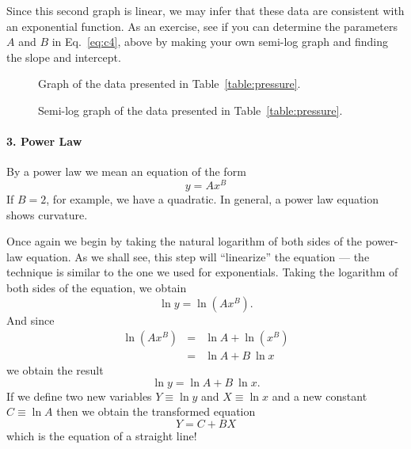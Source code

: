 Since this second
graph is linear, we may infer that these data are consistent with an
exponential function.  As an exercise, see if you can determine the
parameters $A$ and $B$ in Eq.~\ref{eq:c4}, above by making your own
semi-log graph and finding the slope and intercept.

\newpage

\begin{figure}[!hbt]    %
\begin{center}
{}
\end{center}
\caption{Graph of the data presented in Table~\protect\ref{table:pressure}.
          \label{fig:pressure}}
\end{figure}

\begin{figure}[!hbt]   %
\begin{center}
{}
\end{center}
\caption{Semi-log graph of the data presented in Table~\protect\ref{table:pressure}.
          \label{fig:pressure_log}}
\end{figure}



\paragraph*{3. Power Law}


    By a power law we mean an equation of the form
\begin{equation}
y = Ax^{B}  \label{eq:c3}
\end{equation}
If $B = 2$, for example, we have a quadratic.
In general, a power law equation shows curvature.

     Once again we begin by taking the natural logarithm of both sides of the
power-law equation. 
As we shall see, this step will ``linearize'' the equation --- 
the technique is similar to the one we used for
exponentials.  Taking the logarithm of both sides of the equation, we
obtain
\[
\ln y = \ln (Ax^{B}).
\]
And since
\begin{eqnarray*}
\ln (Ax^{B}) & = & \ln A + \ln (x^{B}) \\
              & = & \ln A + B \: \ln x
\end{eqnarray*}
we obtain the result
\[
\ln y = \ln A + B \: \ln x .
\]
If we define two new variables $Y \equiv \ln y$ and $X \equiv \ln
x$ and
a new constant $C \equiv \ln A$ then we obtain the transformed
equation
\[
Y = C + BX
\]
which is the equation of a straight line!

